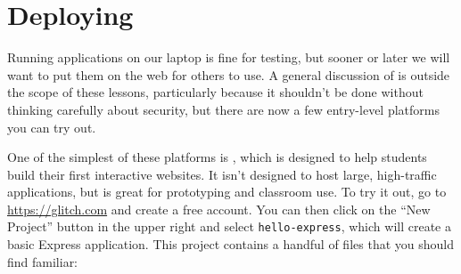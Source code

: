 \chapter{Deploying}\label{s:deploy}

Running applications on our laptop is fine for testing,
but sooner or later we will want to put them on the web for others to use.
A general discussion of  is outside the scope of these lessons,
particularly because it shouldn't be done without thinking carefully about security,
but there are now a few entry-level platforms you can try out.

One of the simplest of these platforms is ,
which is designed to help students build their first interactive websites.
It isn't designed to host large, high-traffic applications,
but is great for prototyping and classroom use.
To try it out,
go to \url{https://glitch.com} and create a free account.
You can then click on the ``New Project'' button in the upper right and select \texttt{hello-express},
which will create a basic Express application.
This project contains a handful of files that you should find familiar:

